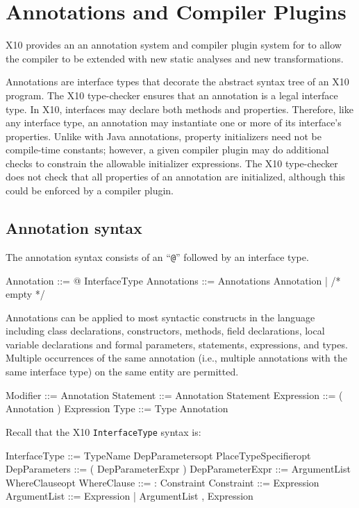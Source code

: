 \chapter{Annotations and Compiler
Plugins}\label{XtenAnnotations}


X10 provides an 
an annotation system and compiler plugin system for to allow the
compiler to be extended with new static analyses and new
transformations.

Annotations are interface types that decorate the abstract syntax tree
of an X10 program.  The X10 type-checker ensures that an annotation
is a legal interface type.
In X10, interfaces may declare
both methods and properties.  Therefore, like any interface type, an
annotation may instantiate
one or more of its interface's properties.
Unlike with Java
annotations,
property initializers need not be
compile-time constants;
however, a given compiler plugin
may do additional checks to constrain the allowable
initializer expressions.
The X10 type-checker does not check that
all properties of an annotation are initialized,
although this could be enforced by
a compiler plugin.

\section{Annotation syntax}

The annotation syntax consists of an ``\texttt{@}'' followed by an interface type.
\begin{x10}
  Annotation  ::= @ InterfaceType
  Annotations ::= Annotations Annotation
                  | /* empty */
\end{x10}
Annotations can be applied to most syntactic constructs in the language
including class declarations, constructors, methods, field declarations,
local variable declarations and formal parameters, statements,
expressions, and types.
Multiple occurrences of the same annotation (i.e., multiple
annotations with the same interface type) on the same entity are permitted.

\begin{x10}
  Modifier ::= Annotation
  Statement ::= Annotation Statement
  Expression ::= ( Annotation ) Expression
  Type ::= Type Annotation
\end{x10}
\noindent
Recall that the X10 \texttt{InterfaceType} syntax is:

\begin{x10}
  InterfaceType     ::= TypeName DepParametersopt
                           PlaceTypeSpecifieropt
  DepParameters     ::= ( DepParameterExpr )
  DepParameterExpr ::= ArgumentList WhereClauseopt
  WhereClause       ::= : Constraint
  Constraint        ::= Expression
  ArgumentList      ::= Expression
                       | ArgumentList , Expression
\end{x10}

